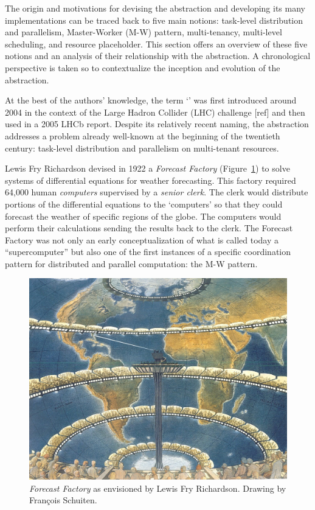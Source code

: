 \documentclass{sig-alternate}
\begin{document}


The origin and motivations for devising the \pilot abstraction and developing
its many implementations can be traced back to five main notions: task-level
distribution and parallelism, Master-Worker (M-W) pattern, multi-tenancy,
multi-level scheduling, and resource placeholder. This section offers an
overview of these five notions and an analysis of their relationship with the
\pilot abstraction. A chronological perspective is taken so to contextualize
the inception and evolution of the \pilot abstraction.

At the best of the authors' knowledge, the term `\pilotjob' was first
introduced around 2004 in the context of the Large Hadron Collider (LHC)
challenge [ref] and then used in a 2005 LHCb report\cite{lhcb2005}. Despite its
relatively recent naming, the \pilot abstraction addresses a problem already
well-known at the beginning of the twentieth century: task-level distribution
and parallelism on multi-tenant resources.

Lewis Fry Richardson devised in 1922 a \textit{Forecast Factory}
(Figure~\ref{fig:figures_forecast-factory}) to solve systems of differential
equations for weather forecasting. This factory required 64,000 human
\textit{computers} supervised by a \textit{senior clerk}. The clerk would
distribute portions of the differential equations to the `computers' so that
they could forecast the weather of specific regions of the globe. The computers
would perform their calculations sending the results back to the clerk. The
Forecast Factory was not only an early conceptualization of what is called
today a ``supercomputer'' but also one of the first instances of a specific
coordination pattern for distributed and parallel computation: the M-W pattern.

\begin{figure}[t]
  \centering
    \includegraphics[width=.45\textwidth]{figures/forecast-factory.jpg}
  \caption{\textit{Forecast Factory} as envisioned by Lewis Fry Richardson.
    Drawing by Fran{\c c}ois Schuiten.}
  \label{fig:figures_forecast-factory}
\end{figure}
\end{document}
